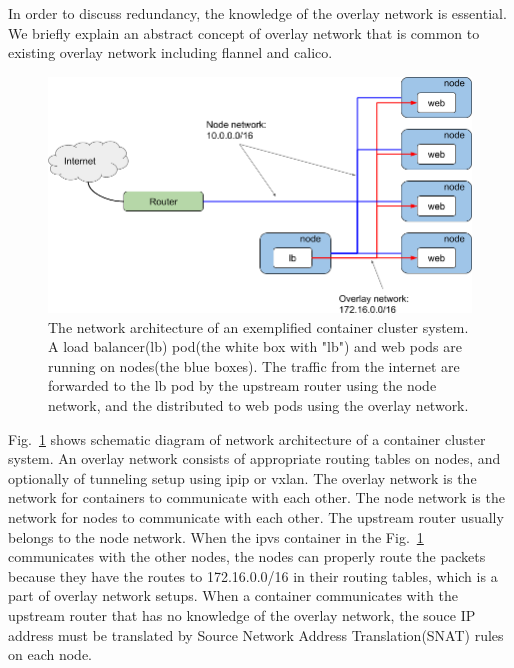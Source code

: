 In order to discuss redundancy, the knowledge of the overlay network is essential.
We briefly explain an abstract concept of overlay network that is common to existing overlay network including flannel\cite{coreos_2018} and calico\cite{project_calico}.

\begin{figure}[tb]
\begin{center}
\includegraphics[width=\columnwidth]{Figs/overlay.png}
\end{center}
\caption{
  The network architecture of an exemplified container cluster system.
  A load balancer(lb) pod(the white box with "lb") and web pods are running on nodes(the blue boxes).
  The traffic from the internet are forwarded to the lb pod by the upstream router using the node network,
  and the distributed to web pods using the overlay network.
}
\label{fig:overlay}
\end{figure}

Fig.~\ref{fig:overlay} shows schematic diagram of network architecture of a container cluster system. 
An overlay network consists of appropriate routing tables on nodes, and optionally of tunneling setup using ipip or vxlan.
The overlay network is the network for containers to communicate with each other. 
The node network is the network for nodes to communicate with each other. 
The upstream router usually belongs to the node network.
When the ipvs container in the Fig.~\ref{fig:overlay} communicates with the other nodes, 
the nodes can properly route the packets because they have the routes to 172.16.0.0/16 in their routing tables, 
which is a part of overlay network setups.
When a container communicates with the upstream router that has no knowledge of the overlay network, the souce IP address must be translated by Source Network Address Translation(SNAT) rules on each node.

